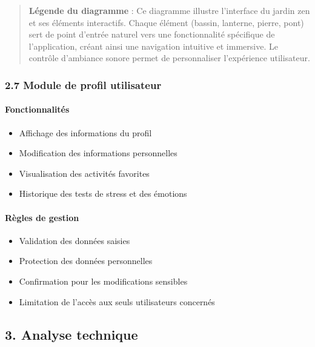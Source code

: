 \documentclass[
]{article}
\providecommand{\tightlist}{%
  \setlength{\itemsep}{0pt}\setlength{\parskip}{0pt}}
\begin{document}
\begin{quote}
\textbf{Légende du diagramme} : Ce diagramme illustre l’interface du
jardin zen et ses éléments interactifs. Chaque élément (bassin,
lanterne, pierre, pont) sert de point d’entrée naturel vers une
fonctionnalité spécifique de l’application, créant ainsi une navigation
intuitive et immersive. Le contrôle d’ambiance sonore permet de
personnaliser l’expérience utilisateur.
\end{quote}

\subsubsection{2.7 Module de profil
utilisateur}\label{module-de-profil-utilisateur}

\paragraph{Fonctionnalités}\label{fonctionnalituxe9s-6}

\begin{itemize}
\tightlist
\item
  Affichage des informations du profil
\item
  Modification des informations personnelles
\item
  Visualisation des activités favorites
\item
  Historique des tests de stress et des émotions
\end{itemize}

\paragraph{Règles de gestion}\label{ruxe8gles-de-gestion-6}

\begin{itemize}
\tightlist
\item
  Validation des données saisies
\item
  Protection des données personnelles
\item
  Confirmation pour les modifications sensibles
\item
  Limitation de l’accès aux seuls utilisateurs concernés
\end{itemize}

\subsection{3. Analyse technique}\label{analyse-technique}
\end{document}
